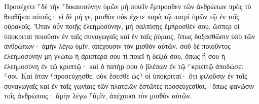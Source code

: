 \documentclass{openreader}
\begin{document}
Προσέχετε ⸀δὲ τὴν ⸀δικαιοσύνην ὑμῶν μὴ ποιεῖν ἔμπροσθεν τῶν ἀνθρώπων πρὸς τὸ θεαθῆναι αὐτοῖς· εἰ δὲ μή γε, μισθὸν οὐκ ἔχετε παρὰ τῷ πατρὶ ὑμῶν τῷ ἐν τοῖς οὐρανοῖς. 
Ὅταν οὖν ποιῇς ἐλεημοσύνην, μὴ σαλπίσῃς ἔμπροσθέν σου, ὥσπερ οἱ ὑποκριταὶ ποιοῦσιν ἐν ταῖς συναγωγαῖς καὶ ἐν ταῖς ῥύμαις, ὅπως δοξασθῶσιν ὑπὸ τῶν ἀνθρώπων· ἀμὴν λέγω ὑμῖν, ἀπέχουσιν τὸν μισθὸν αὐτῶν. 
σοῦ δὲ ποιοῦντος ἐλεημοσύνην μὴ γνώτω ἡ ἀριστερά σου τί ποιεῖ ἡ δεξιά σου, 
ὅπως ᾖ σου ἡ ἐλεημοσύνη ἐν τῷ κρυπτῷ· καὶ ὁ πατήρ σου ὁ βλέπων ἐν τῷ ⸀κρυπτῷ ἀποδώσει ⸀σοι. 
Καὶ ὅταν ⸂προσεύχησθε, οὐκ ἔσεσθε ὡς⸃ οἱ ὑποκριταί· ὅτι φιλοῦσιν ἐν ταῖς συναγωγαῖς καὶ ἐν ταῖς γωνίαις τῶν πλατειῶν ἑστῶτες προσεύχεσθαι, ⸀ὅπως φανῶσιν τοῖς ἀνθρώποις· ἀμὴν λέγω ⸀ὑμῖν, ἀπέχουσι τὸν μισθὸν αὐτῶν. 
\end{document}
